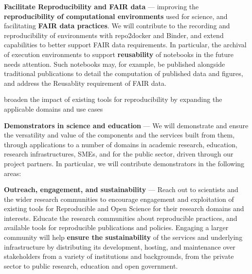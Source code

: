 \begin{compactenum}

\item \label{obj:reproducibility} \textbf{Facilitate Reproducibility and FAIR data} ---
  improving the \textbf{reproducibility of computational environments}
  used for science, and facilitating \textbf{FAIR data practices}.
  We will contribute to the recording and reproducibility
  of environments with repo2docker and Binder,
  and extend capabilities to better support FAIR
  data requirements. In particular, the archival of execution
  environments to support \textbf{reusability} of notebooks in the future
  needs attention. Such notebooks may, for example, be published alongside
  traditional publications to detail the computation of published data
  and figures, and address the Reusablity requirement of FAIR data.

\item \label{obj:broaden} broaden the impact of existing tools for reproducibility by expanding the applicable domains and use cases
\item \label{obj:demonstrators}
  \textbf{Demonstrators in science and education} ---
  We will demonstrate and ensure the versatility and value of the components and
  the services built from them,
  through applications to a number of
  domains in academic research, education, research infrastructures, SMEs, and for
  the public sector, driven through our project partners. In
  particular, we will contribute demonstrators in the following areas:

\item \label{obj:education}
  \textbf{Outreach, engagement, and sustainability} ---
  Reach out to scientists and the wider research
  communities to encourage engagement
  and exploitation of existing tools for Reproducible and Open Science
  for their research domains and interests.
  Educate the research communities about reproducible practices,
  and available tools for reproducible publications and policies.
  Engaging a larger community will help \textbf{ensure the sustainability} of
  the services and underlying infrastructure by distributing its
  development, hosting, and maintenance over stakeholders from a
  variety of institutions and backgrounds,
  from the private sector to public research, education
  and open government.



\end{compactenum}

